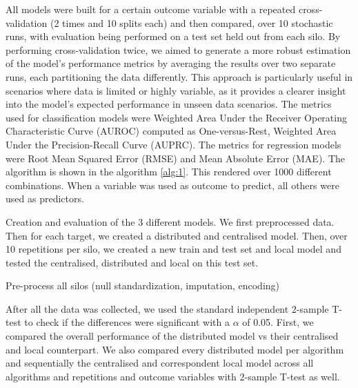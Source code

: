 All models were built for a certain outcome variable with a repeated cross-validation (2 times and 10 splits each) and then compared, over 10 stochastic runs, with evaluation being performed on a test set held out from each silo. By performing cross-validation twice, we aimed to generate a more robust estimation of the model’s performance metrics by averaging the results over two separate runs, each partitioning the data differently. This approach is particularly useful in scenarios where data is limited or highly variable, as it provides a clearer insight into the model's expected performance in unseen data scenarios. The metrics used for classification models were Weighted Area Under the Receiver Operating Characteristic Curve (AUROC) computed as One-versus-Rest, Weighted Area Under the Precision-Recall Curve (AUPRC). The metrics for regression models were Root Mean Squared Error (RMSE) and Mean Absolute Error (MAE). The algorithm is shown in the algorithm \ref{alg:1}. This rendered over 1000 different combinations. When a variable was used as outcome to predict, all others were used as predictors.




\begin{algorithm}[hbtp]
\caption{Creation and evaluation of the 3 different models. We first preprocessed data. Then for each target, we created a distributed and centralised model. Then, over 10 repetitions per silo, we created a new train and test set and local model and tested the centralised, distributed and local on this test set.}
\label{alg:1}
Pre-process all silos (null standardization, imputation, encoding)\;



 \end{algorithm}

After all the data was collected, we used the standard independent 2-sample T-test to check if the differences were significant with a $\alpha$ of 0.05. First, we compared the overall performance of the distributed model vs their centralised and local counterpart.  We also compared every distributed model per algorithm and sequentially the centralised and correspondent local model across all algorithms and repetitions and outcome variables with 2-sample T-test as well.


